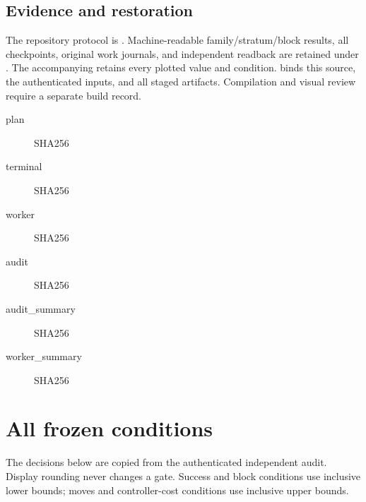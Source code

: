 \documentclass[10pt]{article}
\begin{document}
\subsection*{Evidence and restoration}
The repository protocol is . Machine-readable family/stratum/block results, all checkpoints, original work journals, and independent readback are retained under . The accompanying  retains every plotted value and condition.  binds this source, the authenticated inputs, and all staged artifacts. Compilation and visual review require a separate build record.
{\footnotesize\begin{description}
\item[plan] SHA256 
\item[terminal] SHA256 
\item[worker] SHA256 
\item[audit] SHA256 
\item[audit\_summary] SHA256 
\item[worker\_summary] SHA256 
\end{description}}\clearpage\appendix\section{All frozen conditions}
The decisions below are copied from the authenticated independent audit. Display rounding never changes a gate. Success and block conditions use inclusive lower bounds; moves and controller-cost conditions use inclusive upper bounds.
\end{document}
